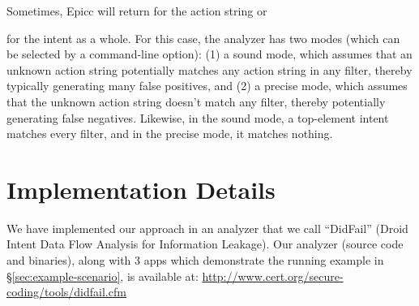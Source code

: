 Sometimes, Epicc will return  for the action string or
{ for the intent as a whole.  For this case, the analyzer
has two modes (which can be selected by a command-line option): 
(1) a sound mode, which assumes that an unknown action string potentially
matches any action string in any filter, thereby typically generating many
false positives, and 
(2) a precise mode, which assumes that the unknown action string doesn't match
any filter, thereby potentially generating false negatives.  
Likewise, in the sound mode, a top-element intent matches every filter, and in
the precise mode, it matches nothing.



\chapter{Implementation Details} \label{sec:test}
We have implemented our approach
in an analyzer 
that we call ``DidFail'' (Droid Intent Data Flow Analysis
for Information Leakage).
%
Our analyzer (source code and binaries), along with 3 apps which demonstrate
the running example in \S\ref{sec:example-scenario},
is available at: \url{http://www.cert.org/secure-coding/tools/didfail.cfm}

}
